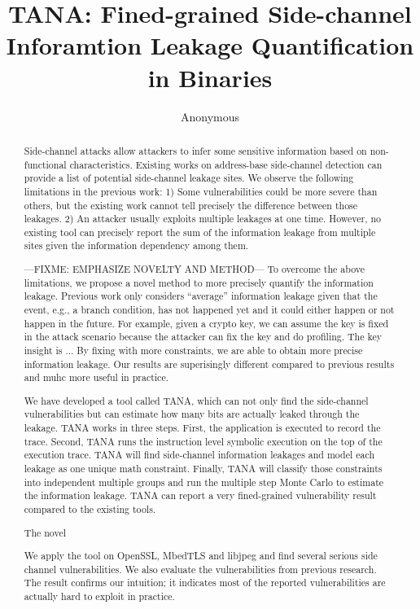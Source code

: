 \documentclass[conference]{IEEEtran}
\begin{document}
\title{TANA: Fined-grained Side-channel Inforamtion Leakage Quantification in Binaries}
\author{Anonymous}

\maketitle

\begin{abstract}
Side-channel attacks allow attackers to infer some sensitive information based on 
non-functional characteristics. Existing works on address-base side-channel detection 
can provide a list of potential side-channel leakage sites. We observe 
 the following limitations in the previous work: 1) 
Some vulnerabilities could be more severe than others, but the existing work 
cannot tell precisely the difference between those leakages. 2)  An attacker usually exploits multiple 
leakages at one time. However, no existing tool can precisely report
the sum of the information leakage from multiple sites given the information dependency among them.

---FIXME: EMPHASIZE NOVELTY AND METHOD---
To overcome the above limitations, we propose a novel method
to more precisely quantify the information leakage. Previous work only considers
``average'' information leakage given that the event, e.g., a branch condition, has not happened yet and
it could either happen or not happen in the future. For example, given a crypto key, we can assume the key is fixed
in the attack scenario because the attacker can fix the key and do profiling. The key insight is ...
By fixing with more constraints, we are able to obtain more precise information leakage.
Our results are superisingly different compared to previous results and muhc more useful in practice.


We have developed a tool called TANA, which can not only 
find the side-channel vulnerabilities but can estimate how many bits are actually leaked 
through the leakage. TANA works in three steps. First, the application is executed to record the 
trace. Second, TANA runs the instruction level symbolic execution on the top of the 
execution trace. TANA will find side-channel information leakages and model each leakage 
as one unique math constraint. Finally, TANA will classify those constraints into 
independent multiple groups and run the multiple step Monte Carlo to estimate the 
information leakage. TANA can report a very fined-grained vulnerability result 
compared to the existing tools.

The novel

We apply the tool on OpenSSL, MbedTLS and libjpeg and find several serious side channel 
vulnerabilities. We also evaluate the vulnerabilities from previous research. The result 
confirms our intuition; it 
indicates most of the reported vulnerabilities are actually hard to exploit in practice.

\end{abstract}
\end{document}
